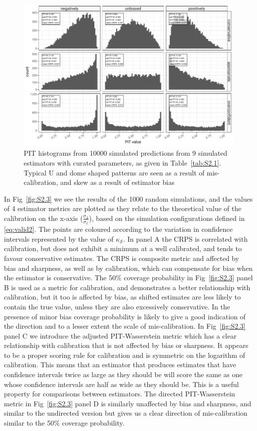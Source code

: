 \documentclass[a4paper, 12pt, twoside]{article}
\begin{document}
\begin{figure}[ht!]
\centering
\includegraphics{fig/fig2-pit-histograms}
\caption{PIT histograms from 10000 simulated predictions from 9 simulated estimators with curated parameters, as given in Table~\ref{tab:S2.1}. Typical U and dome shaped patterns are seen as a result of mis-calibration, and skew as a result of estimator bias}
\label{fig:S2.2}
\end{figure}

In Fig~\ref{fig:S2.3} we see the results of the 1000 random simulations, and the values of 4 estimator metrics are plotted as they relate to the theoretical value of the calibration on the x-axis ($\frac{\sigma_\mathcal{S}}{\sigma_\mathcal{E}}$), based on the simulation configurations defined in \eqref{eq:valid2}. The points are coloured according to the variation in confidence intervals represented by the value of $\kappa_\mathcal{S}$. In panel A the CRPS is correlated with calibration, but does not exhibit a minimum at a well calibrated, and tends to favour conservative estimates. The CRPS is composite metric and affected by bias and sharpness, as well as by calibration, which can compensate for bias when the estimator is conservative. The 50\% coverage probability in Fig~\ref{fig:S2.3} panel B is used as a metric for calibration, and demonstrates a better relationship with calibration, but it too is affected by bias, as shifted estimates are less likely to contain the true value, unless they are also excessively conservative. In the presence of minor bias coverage probability is likely to give a good indication of the direction and to a lesser extent the scale of mis-calibration. In Fig~\ref{fig:S2.3} panel C we introduce the adjusted PIT-Wasserstein metric which has a clear relationship with calibration that is not affected by bias or sharpness. It appears to be a proper scoring rule for calibration and is symmetric on the logarithm of calibration. This means that an estimator that produces estimates that have confidence intervals twice as large as they should be will score the same as one whose confidence intervals are half as wide as they should be. This is a useful property for comparisons between estimators. The directed PIT-Wasserstein metric in Fig~\ref{fig:S2.3} panel D is similarly unaffected by bias and sharpness, and similar to the undirected version but gives us a clear direction of mis-calibration similar to the 50\% coverage probability.
\end{document}
